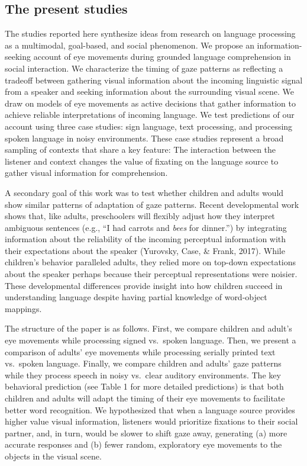 \documentclass[english,floatsintext,man]{apa6}
\begin{document}
\hypertarget{the-present-studies}{%
\subsection{The present studies}\label{the-present-studies}}

The studies reported here synthesize ideas from research on language
processing as a multimodal, goal-based, and social phenomenon. We
propose an information-seeking account of eye movements during grounded
language comprehension in social interaction. We characterize the timing
of gaze patterns as reflecting a tradeoff between gathering visual
information about the incoming linguistic signal from a speaker and
seeking information about the surrounding visual scene. We draw on
models of eye movements as active decisions that gather information to
achieve reliable interpretations of incoming language. We test
predictions of our account using three case studies: sign language, text
processing, and processing spoken language in noisy environments. These
case studies represent a broad sampling of contexts that share a key
feature: The interaction between the listener and context changes the
value of fixating on the language source to gather visual information
for comprehension.

A secondary goal of this work was to test whether children and adults
would show similar patterns of adaptation of gaze patterns. Recent
developmental work shows that, like adults, preschoolers will flexibly
adjust how they interpret ambiguous sentences (e.g., \enquote{I had
carrots and \emph{bees} for dinner.}) by integrating information about
the reliability of the incoming perceptual information with their
expectations about the speaker (Yurovsky, Case, \& Frank, 2017). While
children's behavior paralleled adults, they relied more on top-down
expectations about the speaker perhaps because their perceptual
representations were noisier. These developmental differences provide
insight into how children succeed in understanding language despite
having partial knowledge of word-object mappings.

The structure of the paper is as follows. First, we compare children and
adult's eye movements while processing signed vs.~spoken language. Then,
we present a comparison of adults' eye movements while processing
serially printed text vs.~spoken language. Finally, we compare children
and adults' gaze patterns while they process speech in noisy vs.~clear
auditory environments. The key behavioral prediction (see Table 1 for
more detailed predictions) is that both children and adults will adapt
the timing of their eye movements to facilitate better word recognition.
We hypothesized that when a language source provides higher value visual
information, listeners would prioritize fixations to their social
partner, and, in turn, would be slower to shift gaze away, generating
(a) more accurate responses and (b) fewer random, exploratory eye
movements to the objects in the visual scene.
\end{document}
